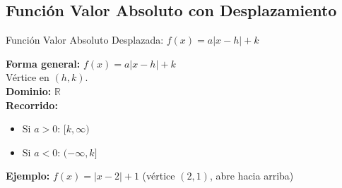 \documentclass[12pt,a4paper]{article}
\begin{document}
\subsection{Función Valor Absoluto con Desplazamiento}
\begin{funcbox}{Función Valor Absoluto Desplazada: $f(x)=a|x-h|+k$}
\begin{minipage}[t]{0.55\textwidth}
    \textbf{Forma general:} $f(x)=a|x-h|+k$\\
    Vértice en $(h,k)$.\\
    \textbf{Dominio:} $\mathbb{R}$\\
    \textbf{Recorrido:}
    \begin{itemize}
        \item Si $a>0$: $[k,\infty)$
        \item Si $a<0$: $(-\infty,k]$
    \end{itemize}
    \textbf{Ejemplo:} $f(x)=|x-2|+1$ (vértice $(2,1)$, abre hacia arriba)
\end{minipage}\hfill
\begin{minipage}[t]{0.4\textwidth}
    \centering
\end{minipage}
\end{funcbox}

\end{document}
